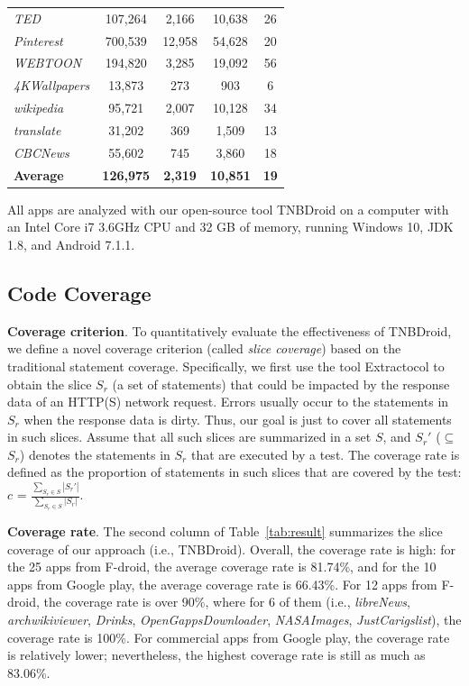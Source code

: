 \documentclass[sigconf,review, anonymous]{acmart}
\begin{document}
\begin{table}[t!]
\begin{tabular}{|l|c|c|c|c|}
{\it TED}&107,264&2,166&10,638&26
\\
{\it Pinterest}&700,539&12,958&54,628&20
\\
{\it WEBTOON}&194,820&3,285&19,092&56
\\
{\it 4KWallpapers}&13,873&273&903&6
\\
{\it wikipedia}&95,721&2,007&10,128&34
\\
{\it translate}&31,202&369&1,509&13
\\
{\it CBCNews}&55,602&745&3,860&18
\\\hline
{\bf Average}&{\bf 126,975}&{\bf 2,319}&{\bf 10,851}&{\bf 19}
\\\hline
\end{tabular}\label{tab:benchmark}
\end{table}



All apps are analyzed with our open-source tool \textsf{TNBDroid} on a computer with an Intel Core i7 3.6GHz CPU and 32 GB of memory, running Windows 10, JDK 1.8, and Android 7.1.1. %


\subsection{Code Coverage}
\textbf{Coverage criterion}. To quantitatively evaluate the effectiveness of \textsf{TNBDroid}, we define a novel coverage criterion (called \textit{slice coverage}) based on the traditional statement coverage. Specifically, we first use the tool \textsf{Extractocol} to obtain the slice $S_r$ (a set of statements) that could be impacted by the response data of an HTTP(S) network request. Errors usually occur to the statements in $S_r$ when the response data is dirty. Thus, our goal is just to cover all statements in such slices. Assume that all such slices are summarized in a set $S$, and $S_r'$ ($\subseteq$ $S_r$) denotes the statements in $S_r$ that are executed by a test. The coverage rate is defined as the proportion of statements in such slices that are covered by the test: $c$ = $\frac{\sum\limits_{S_r\in S}|S_r'|}{\sum\limits_{S_r\in S}|S_r|}$.       

\textbf{Coverage rate}. The second column of Table~\ref{tab:result} summarizes the slice coverage of our approach (i.e., \textsf{TNBDroid}). Overall, the coverage rate is high: for the 25 apps from F-droid, the average coverage rate is 81.74\%, and for the 10 apps from Google play, the average coverage rate is 66.43\%. For 12 apps from F-droid, the coverage rate is over 90\%, where for 6 of them (i.e., {\it libreNews}, {\it archwikiviewer}, {\it Drinks}, {\it OpenGappsDownloader}, {\it NASAImages},  {\it JustCarigslist}), the coverage rate is 100\%. For commercial apps from Google play, the coverage rate is relatively lower; nevertheless, the highest coverage rate is still as much as 83.06\%. 
\end{document}
